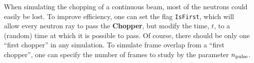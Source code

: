 When simulating the chopping of a continuous beam,
most of the neutrons could easily be lost.
To improve efficiency, one can set the flag \verb+IsFirst+, which will
allow every neutron ray to pass the {\bf Chopper}, but modify the
time, $t$, to a (random) time at which it is possible to pass.
Of course, there should be only one ``first chopper'' in
any simulation.
To simulate frame overlap from a ``first chopper'', one can specify
the number of frames to study by the parameter $n_{\rm pulse}$.

